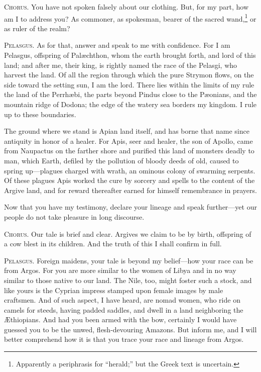 \documentclass[12pt]{article}
\begin{document}
\textsc{Chorus.} You have not spoken falsely about our clothing. But, for my part, how am I to address you? As commoner, as spokesman, bearer of the sacred wand,\footnote{Apparently a periphrasis for ``herald;'' but the Greek text is uncertain.} or as ruler of the realm?

\textsc{Pelasgus.} As for that, answer and speak to me with confidence. For I am Pelasgus, offspring of Pal{\ae}chthon, whom the earth brought forth, and lord of this land; and after me, their king, is rightly named the race of the Pelasgi, who harvest the land. Of all the region through which the pure Strymon flows, on the side toward the setting sun, I am the lord. There lies within the limits of my rule the land of the Perrh{\ae}bi, the parts beyond Pindus close to the P{\ae}onians, and the mountain ridge of Dodona; the edge of the watery sea borders my kingdom. I rule up to these boundaries.

The ground where we stand is Apian land itself, and has borne that name since antiquity in honor of a healer. For Apis, seer and healer, the son of Apollo, came from Naupactus on the farther shore and purified this land of monsters deadly to man, which Earth, defiled by the pollution of bloody deeds of old, caused to spring up---plagues charged with wrath, an ominous colony of swarming serpents. Of these plagues Apis worked the cure by sorcery and spells to the content of the Argive land, and for reward thereafter earned for himself remembrance in prayers.

Now that you have my testimony, declare your lineage and speak further---yet our people do not take pleasure in long discourse.

\textsc{Chorus.} Our tale is brief and clear. Argives we claim to be by birth, offspring of a cow blest in its children. And the truth of this I shall confirm in full.

\textsc{Pelasgus.} Foreign maidens, your tale is beyond my belief---how your race can be from Argos. For you are more similar to the women of Libya and in no way similar to those native to our land. The Nile, too, might foster such a stock, and like yours is the Cyprian impress stamped upon female images by male craftsmen. And of such aspect, I have heard, are nomad women, who ride on camels for steeds, having padded saddles, and dwell in a land neighboring the {\AE}thiopians. And had you been armed with the bow, certainly I would have guessed you to be the unwed, flesh-devouring Amazons. But inform me, and I will better comprehend how it is that you trace your race and lineage from Argos.
\end{document}
